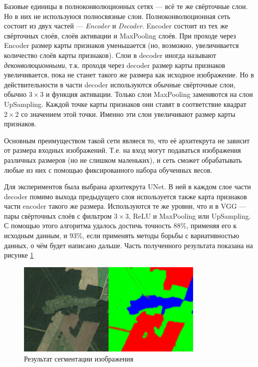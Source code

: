 Базовые единицы в полноконволюционных сетях --- всё те же свёрточные слои. Но в
них не используюся полносвязные слои.  Полноконволюционная сеть состоит из двух
частей --- \textit{Encoder} и \textit{Decoder}. Encoder состоит из тех же
свёрточных слоёв, слоёв активации и MaxPooling слоёв. При проходе через Encoder
размер карты признаков уменьшается (но, возможно, увеличивается количество слоёв
карты признаков). Слои в decoder иногда называют \textit{деконволюционными},
т.к. проходя через decoder размер карты признаков увеличивается, пока не станет
такого же размера как исходное изображение. Но в действительности в части
decoder используются обычные свёрточные слои, обычно $3 \times 3$ и функция
активации. Только слои MaxPooling заменяются на слои UpSampling. Каждой точке
карты признаков они ставят в соответствие квадрат $2 \times 2$ со значением этой
точки. Именно эти слои увеличивают размер карты признаков.

Основным преимуществом такой сети являеся то, что её архитекрута не зависит от
размера входных изображений. Т.е. на вход могут подаваться изображения различных
размеров (но не слишком маленьких), и сеть сможет обрабатывать любые из них
с помощью фиксированного набора обученных весов.

Для экспериментов была выбрана архитекрута UNet. В ней в каждом слое части
decoder помимо выхода предыдущего слоя используется также карта признаков части
encoder такого же размера. Используются те же уровни, что и в VGG --- пары
свёрточных слоёв с фильтром $3 \times 3$, ReLU и MaxPooling или UpSampling.
С помощью этого алгоритма удалось достичь точность $88\%$, применяя его к
исходным данным, и $93\%$, если применять методы борьбы с вариативностью данных,
о чём будет написано дальше. %
Часть полученного результата показана на рисунке \ref{fig:segm_result}

\begin{figure}[p]
    \centering
    \caption{Результат сегментации изображения}
    \label{fig:segm_result}
    \includegraphics[width=0.8\textwidth]{images/segm_results_yandex.png}
\end{figure}

